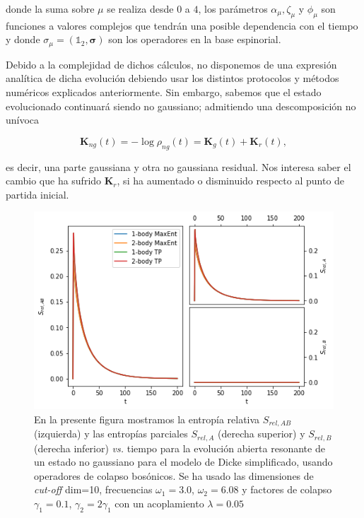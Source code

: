 \documentclass{report} %
\numberwithin{equation}{section}
\begin{document}
donde la suma sobre $\mu$ se realiza desde $0$ a $4$, los parámetros $\alpha_{\mu}, \zeta_{\mu}$ y $\phi_{\mu}$ son funciones a valores complejos que tendrán una posible dependencia con el tiempo y donde $\sigma_{\mu} = (\mathds{1}_2, {\boldsymbol \sigma})$ son los operadores en la base espinorial. 

Debido a la complejidad de dichos cálculos, no disponemos de una expresión analítica de dicha evolución debiendo usar los distintos protocolos y métodos numéricos explicados anteriormente. Sin embargo, sabemos que el estado evolucionado continuará siendo no gaussiano; admitiendo una descomposición no unívoca

$$
\mathbf{K}_{ng}(t) = -\log \rho_{ng}(t) = \mathbf{K}_{g}(t)+\mathbf{K}_{r}(t),
$$

es decir, una parte gaussiana y otra no gaussiana residual. Nos interesa saber el cambio que ha sufrido $\mathbf{K}_{r}$, si ha aumentado o disminuido respecto al punto de partida inicial. 

\begin{figure}
    \centering
    \includegraphics[scale=0.7]{figs/section3_4/section5_bxs_ng/rel_entropy_open_nonres_ng.png}
    \caption{En la presente figura mostramos la entropía relativa $S_{rel,AB}$ (izquierda) y las entropías parciales $S_{rel,A}$ (derecha superior) y $S_{rel,B}$ (derecha inferior) \textit{vs.} tiempo para la evolución abierta resonante de un estado no gaussiano para el modelo de Dicke simplificado, usando operadores de colapso bosónicos. Se ha usado las dimensiones de \textit{cut-off} dim=10, frecuencias $\omega_1 = 3.0$, $\omega_2 = 6.08$ y factores de colapso $\gamma_1 = 0.1$, $\gamma_2 = 2 \gamma_1$ con un acoplamiento $\lambda= 0.05$}
    \label{rels_open-nr}
\end{figure}
\end{document}
